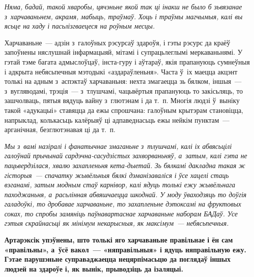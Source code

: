 \emph{Няма, бадай, такой хваробы, цячэньне якой так ці інакш не было б зьвязанае з~харчаваньнем, акрамя, мабыць, траўмаў. Хоць і траўмы магчымыя, калі вы ясьце на хаду і пасьлізгваецеся на роўным месцы.}

Харчаваньне~--- адзін з~галоўных рэсурсаў здароўя, і гэты рэсурс да краёў запоўнены няслушнай інфармацыяй, мітамі і супрацьлеглымі меркаваньнямі. У гэтай тэме багата адмыслоўцаў, інста-гуру і аўтараў, якія прапануюць сумнеўныя і адкрыта небясьпечныя мэтодыкі «аздараўленьня». Часта ў~іх маецца акцэнт толькі на адным з~аспэктаў харчаваньня: нехта змагаецца зь бялком, іншыя~--- з~вугляводамі, трэція~--- з~тлушчамі, чацьвёртыя прапануюць то закісьляць, то зашчолваць, пятыя вядуць вайну з~глютэнам і да т.~п. Многія людзі ў~выніку такой «адукацыі» ставяцца да ежы спрошчана: галоўным крытэрам становіцца, напрыклад, колькасьць калёрыяў ці адпаведнасьць ежы нейкім пунктам~--- арганічная, безглютэнавая ці да т.~п.


\emph{Мы з~вамі назіралі і фанатычнае змаганьне з~тлушчамі, калі іх абвясьцілі галоўнай прычынай сардэчна-сасудзістых захворваньняў, а~затым, калі гэта не пацьвердзілася, хвалю захапленьня кета-дыетай. Зь бялкамі дакладна такая ж гісторыя~--- спачатку жывёльныя бялкі дэманізаваліся і ўсе хацелі стаць вэганамі, затым модным стаў карнівор, калі ядуць толькі ежу жывёльнага паходжаньня, а~расьлінная абвяшчаецца шкоднай. У моду ўваходзяць то доўгія галадоўкі, то дробавае харчаваньне, то захапленьне дэтоксамі на фруктовых соках, то спробы замяніць паўнавартаснае харчаваньне наборам БАДаў. Усе гэтыя скрайнасьці як мінімум некарысныя, як максімум~--- небясьпечныя.}


\textbf{Артарэксік упэўнены, што толькі яго харчаваньне правільнае і ён сам «правільны», а~ўсё вакол~--- «няправільныя» і ядуць няправільную ежу. Гэтае парушэньне суправаджаецца нецярпімасьцю да поглядаў іншых людзей на здароўе і, як вынік, прыводзіць да ізаляцыі.}

